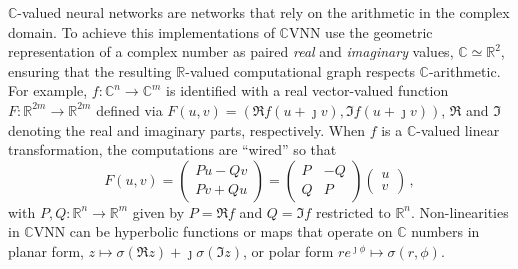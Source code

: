 \documentclass[a4paper,10pt,twocolumn]{article}
\newcommand{\real}{\mathbb{R}}
\newcommand{\cplx}{\mathbb{C}}
\newcommand{\iu}{{\jmath}}
\begin{document}
$\cplx$-valued neural networks are networks that rely on the arithmetic in the complex
domain. To achieve this implementations of $\cplx$VNN use the geometric representation
of a complex number as paired \emph{real} and \emph{imaginary} values, $\cplx \simeq \real^2$,
ensuring that the resulting $\real$-valued computational graph respects $\cplx$-arithmetic.
For example, $
  f\colon \cplx^n \to \cplx^m
$ is identified with a real vector-valued function $
  F\colon \real^{2 m} \to \real^{2 m}
$ defined via $
  F(u, v) = (\Re f(u + \iu v), \Im f(u + \iu v))
$, $\Re$ and $\Im$ denoting the real and imaginary parts, respectively. When $f$ is
a $\cplx$-valued linear transformation, the computations are ``wired'' so that
\begin{equation}  \label{eq:cplx-lin-op}
  F(u, v)
    =
    \begin{pmatrix}
      P u - Q v \\
      P v + Q u
    \end{pmatrix}
    = \begin{pmatrix}
      P & - Q \\ Q & P
    \end{pmatrix} \begin{pmatrix}
      u \\ v
    \end{pmatrix}
    \,,
\end{equation}
with $
  P, Q \colon \real^{n} \to \real^{m}
$ given by $P = \Re f$ and $Q = \Im f$ restricted to $\real^{n}$.
%
Non-linearities in $\cplx$VNN can be hyperbolic functions or maps that operate on
$\cplx$ numbers in planar form, $
  z \mapsto \sigma(\Re{z}) + \iu \sigma(\Im{z}) %
$, or polar form $
  r e^{\iu \phi} \mapsto \sigma(r, \phi)
$.
\end{document}
